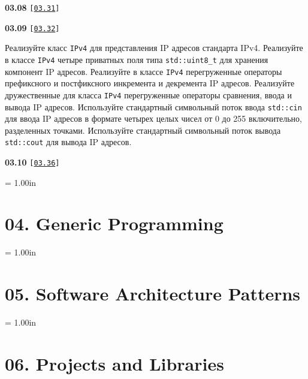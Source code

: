 \documentclass[a4paper,12pt]{article}
\begin{document}
\bigskip

{\large \textbf{03.08} \texttt{[\href{https://github.com/i-s-m-mipt/Education/blob/master/projects/examples/source/03.31.cpp}{\texttt{03.31}}]}}

\bigskip

\bigskip

{\large \textbf{03.09} \texttt{[\href{https://github.com/i-s-m-mipt/Education/blob/master/projects/examples/source/03.32.cpp}{\texttt{03.32}}]}}

\bigskip

Реализуйте класс \lstinline{IPv4} для представления IP адресов стандарта IPv4. Реализуйте в классе \lstinline{IPv4} четыре приватных поля типа \lstinline{std::uint8_t} для хранения компонент IP адресов. Реализуйте в классе \lstinline{IPv4} перегруженные операторы префиксного и постфиксного инкремента и декремента IP адресов. Реализуйте дружественные для класса \lstinline{IPv4} перегруженные операторы сравнения, ввода и вывода IP адресов. Используйте стандартный символьный поток ввода \lstinline{std::cin} для ввода IP адресов в формате четырех целых чисел от 0 до 255 включительно, разделенных точками. Используйте стандартный символьный поток вывода \lstinline{std::cout} для вывода IP адресов.

\bigskip

{\large \textbf{03.10} \texttt{[\href{https://github.com/i-s-m-mipt/Education/blob/master/projects/examples/source/03.36.cpp}{\texttt{03.36}}]}}

\bigskip



\newpage\thispagestyle{empty}\pdfpageheight = 1.00in\enlargethispage{100in}

\section{04. Generic Programming}



\newpage\thispagestyle{empty}\pdfpageheight = 1.00in\enlargethispage{100in}

\section{05. Software Architecture Patterns}



\newpage\thispagestyle{empty}\pdfpageheight = 1.00in\enlargethispage{100in}

\section{06. Projects and Libraries}
\end{document}
